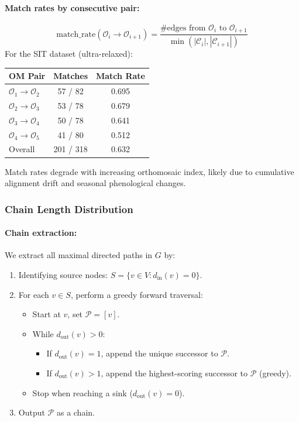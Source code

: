 \paragraph{Match rates by consecutive pair:}
\[
\text{match\_rate}(\mathcal{O}_i \to \mathcal{O}_{i+1}) = \frac{\text{\# edges from $\mathcal{O}_i$ to $\mathcal{O}_{i+1}$}}{\min(|\mathcal{C}_i|, |\mathcal{C}_{i+1}|)}
\]
For the SIT dataset (ultra-relaxed):
\begin{center}
\begin{tabular}{lcc}
\toprule
OM Pair & Matches & Match Rate \\
\midrule
$\mathcal{O}_1 \to \mathcal{O}_2$ & 57 / 82 & 0.695 \\
$\mathcal{O}_2 \to \mathcal{O}_3$ & 53 / 78 & 0.679 \\
$\mathcal{O}_3 \to \mathcal{O}_4$ & 50 / 78 & 0.641 \\
$\mathcal{O}_4 \to \mathcal{O}_5$ & 41 / 80 & 0.512 \\
\midrule
Overall & 201 / 318 & 0.632 \\
\bottomrule
\end{tabular}
\end{center}
Match rates degrade with increasing orthomosaic index, likely due to cumulative alignment drift and seasonal phenological changes.

\subsubsection{Chain Length Distribution}

\paragraph{Chain extraction:} We extract all maximal directed paths in $G$ by:
\begin{enumerate}
    \item Identifying source nodes: $S = \{v \in V : d_{\text{in}}(v) = 0\}$.
    \item For each $v \in S$, perform a greedy forward traversal:
    \begin{itemize}
        \item Start at $v$, set $\mathcal{P} = [v]$.
        \item While $d_{\text{out}}(v) > 0$:
        \begin{itemize}
            \item If $d_{\text{out}}(v) = 1$, append the unique successor to $\mathcal{P}$.
            \item If $d_{\text{out}}(v) > 1$, append the highest-scoring successor to $\mathcal{P}$ (greedy).
        \end{itemize}
        \item Stop when reaching a sink ($d_{\text{out}}(v) = 0$).
    \end{itemize}
    \item Output $\mathcal{P}$ as a chain.
\end{enumerate}

